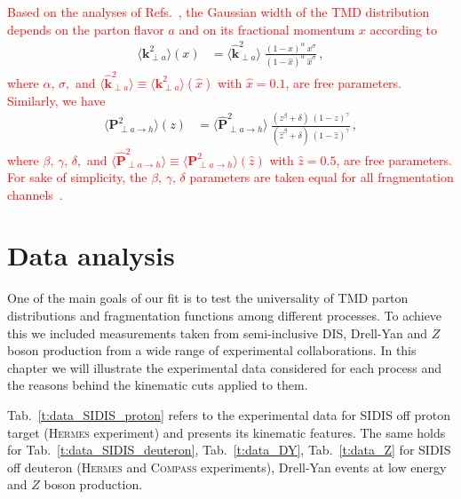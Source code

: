 \documentclass[aps,preprintnumbers,showpacs,nofootinbib,superscriptaddress,floatfix]{revtex4}
\newcommand{\hermes}{\textsc{Hermes }}
\newcommand{\compass}{\textsc{Compass }}
\newcommand{\T}{\perp}
\begin{document}
\textcolor{red}{Based on the analyses of Refs.~\cite{Signori:2013mda,Bacchetta:2015ora}, the Gaussian width of the TMD distribution depends on the parton flavor $a$ and on its fractional momentum $x$ according to}
\begin{align} 
\big\langle \bm{k}_{\T a}^2 \big\rangle (x) &= \big\langle \hat{\bm{k}}_{\T a}^2 \big\rangle \;  
\frac{(1-x)^{\alpha} \  x^{\sigma} }{ (1 - \hat{x})^{\alpha} \  \hat{x}^{\sigma} } \, ,
\label{e:kT2_kin}
\end{align}
\textcolor{red}{where $\alpha, \, \sigma,$ and $\big\langle \hat{\bm{k}}_{\T a}^2 \big\rangle \equiv \big\langle \bm{k}_{\T a}^2 \big\rangle (\hat{x})$ with $\hat{x} = 0.1$, are free parameters. Similarly, we have}
\begin{align}  
\big\langle \bm{P}_{\T a \to h}^2 \big\rangle (z) &= \big\langle \hat{\bm{P}}_{\T a \to h}^2 \big\rangle \  
               \frac{ (z^{\beta} + \delta)\ (1-z)^{\gamma} }{ (\hat{z}^{\beta} + \delta)\   (1 - \hat{z})^{\gamma} } \, ,
 \label{e:PT2_kin}
 \end{align}
 \textcolor{red}{where $\beta, \, \gamma, \, \delta, $ and $\big\langle \hat{\bm{P}}_{\T a \to h}^2 \big\rangle \equiv \big \langle \bm{P}_{\T a \to h}^2 \big\rangle (\hat{z})$ with $\hat{z} = 0.5$, are free parameters. For sake of simplicity, the $\beta, \, \gamma, \, \delta$ parameters are taken equal for all fragmentation channels~\cite{Signori:2013mda,Bacchetta:2015ora}. }





\newpage
\section{Data analysis}
\label{s:data_analysis}

One of the main goals of our fit is to test the universality of TMD parton distributions and fragmentation functions among different processes.
To achieve this we included measurements taken from semi-inclusive DIS, Drell-Yan and $Z$ boson production from a wide range of experimental collaborations. 
In this chapter we will illustrate the experimental data considered for each process and the reasons behind the kinematic cuts applied to them.

Tab.~\ref{t:data_SIDIS_proton} refers to the experimental data for SIDIS off proton target (\hermes experiment) and presents its kinematic features. 
The same holds for Tab.~\ref{t:data_SIDIS_deuteron}, Tab.~\ref{t:data_DY}, Tab.~\ref{t:data_Z} for SIDIS off deuteron (\hermes and \compass experiments), Drell-Yan events at low energy and $Z$ boson production.
\end{document}
